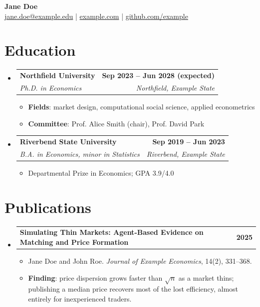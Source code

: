 \documentclass[11pt,a4paper]{article}
\makeatletter
\newcommand{\resumeItem}[1]{
  \item\small{
    {#1 \vspace{-2pt}}
  }
}
\newcommand{\resumeSubheading}[4]{
  \vspace{-2pt}\item
    \begin{tabular*}{0.97\textwidth}[t]{l@{\extracolsep{\fill}}r}
      \textbf{#1} & \textbf{\color{AcademicBlue}#2} \\[-3pt]
      \textit{\small#3} & \textit{\small #4} \\
    \end{tabular*}\vspace{-7pt}
}
\newcommand{\resumeProjectHeading}[2]{
    \vspace{-1pt}\item
    \begin{tabularx}{0.97\textwidth}{@{}>{\raggedright\arraybackslash}X@{\hspace{1.2em}}r@{}}
      \small#1 & \textbf{\color{AcademicBlue}#2} \\
    \end{tabularx}\vspace{-7pt}
}
\newcommand{\resumeSubHeadingListStart}{\begin{itemize}[leftmargin=0.15in, label={}]}
\newcommand{\resumeSubHeadingListEnd}{\end{itemize}}
\newcommand{\resumeItemListStart}{\begin{itemize}[leftmargin=0.15in, label={\tiny\raisebox{0.5ex}{\color{AcademicBlue}$\bullet$}}]}
\newcommand{\resumeItemListEnd}{\end{itemize}\vspace{-5pt}}
\makeatother
\begin{document}
\begin{center}
    {\Huge \textbf{\color{AcademicBlue}Jane Doe}} \\ \vspace{2pt}
    \small
    \faEnvelope \hspace{2pt} \href{mailto:jane.doe@example.edu}{jane.doe@example.edu} \quad | \quad
    \faGlobe \hspace{2pt} \href{https://example.com}{example.com} \quad | \quad
    \faGithub \hspace{2pt} \href{https://github.com/example}{github.com/example}
\end{center}

\section{Education}
  \resumeSubHeadingListStart

    \resumeSubheading
      {Northfield University}{Sep 2023 -- Jun 2028 (expected)}
      {Ph.D. in Economics}{Northfield, Example State}
      \resumeItemListStart
        \resumeItem{\textbf{Fields}: market design, computational social science, applied econometrics}
        \resumeItem{\textbf{Committee}: Prof. Alice Smith (chair), Prof. David Park}
      \resumeItemListEnd

    \resumeSubheading
      {Riverbend State University}{Sep 2019 -- Jun 2023}
      {B.A. in Economics, minor in Statistics}{Riverbend, Example State}
      \resumeItemListStart
        \resumeItem{Departmental Prize in Economics; GPA 3.9/4.0}
      \resumeItemListEnd
  \resumeSubHeadingListEnd

\section{Publications}
  \resumeSubHeadingListStart

    \resumeProjectHeading
      {\textbf{Simulating Thin Markets: Agent-Based Evidence on Matching and Price Formation}}{\textbf{2025}}
    \resumeItemListStart
        \resumeItem{Jane Doe and John Roe. \emph{Journal of Example Economics}, 14(2), 331--368.}
        \resumeItem{\textbf{Finding}: price dispersion grows faster than $\sqrt{n}$ as a market thins; publishing a median price recovers most of the lost efficiency, almost entirely for inexperienced traders.}
    \resumeItemListEnd

  \resumeSubHeadingListEnd
\end{document}
